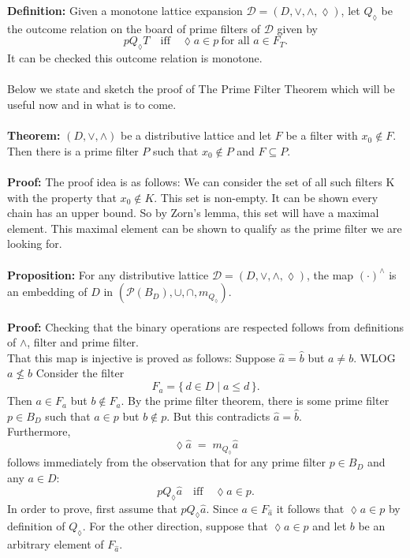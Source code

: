 \documentclass[12pt]{article}
\begin{document}
\textbf{Definition:}  
Given a monotone lattice expansion $\mathcal{D} = (D, \vee, \wedge, \lozenge)$,  
let $Q_{\lozenge}$ be the outcome relation on the board of prime filters of $\mathcal{D}$ given by
\[
p Q_{\lozenge} T \quad \text{iff} \quad \lozenge a \in p \ \text{for all } a \in F_{T}.
\]
It can be checked this outcome relation is monotone. \\ \\
Below we state and sketch the proof of The Prime Filter Theorem which will be useful now and in what is to come. \\ \\
\textbf{Theorem:} $(D,\vee,\wedge)$ be a distributive lattice and let $F$ be a filter with $x_0 \notin F$. 
Then there is a prime filter $P$ such that $x_0\notin P$ and $F\subseteq P$.\\ \\
\textbf{Proof:} The proof idea is as follows: We can consider the set of all such filters K with the property that $x_0 \notin K $. This set is non-empty. It can be shown every chain has an upper bound. So by Zorn's lemma, this set will have a maximal element. This maximal element can be shown to qualify as the prime filter we are looking for. \\ \\
\textbf{Proposition:} For any distributive lattice $\mathcal{D}=(D, \vee, \wedge, \lozenge)$, the map $(\cdot)^{\wedge}$ is an embedding of $D$ in 
$(\mathcal{P}(B_D), \cup, \cap,m_{Q_{\lozenge}})$. \\ \\
\textbf{Proof:} Checking that the binary operations are respected follows from definitions of $\wedge$, filter and prime filter. \\
That this map is injective is proved as follows:  
Suppose $\widehat{a} = \widehat{b}$ but $a \neq b$. WLOG $a \nleq b$
Consider the filter 
\[
F_{a} = \{\, d \in D \mid a \leq d \,\}.
\]
Then $a \in F_{a}$ but $b \notin F_{a}$.  
By the prime filter theorem, there is some prime filter $p \in B_{D}$ such that  
$a \in p$ but $b \notin p$.  
But this contradicts $\widehat{a} = \widehat{b}$. \\
Furthermore, 
\[
\lozenge \widehat{a} \;=\; m_{Q_{\lozenge}} \widehat{a}
\]
follows immediately from the observation that for any prime filter $p \in B_{D}$ and any $a \in D$:  
\[
p Q_{\lozenge} \widehat{a} \quad \text{iff} \quad \lozenge a \in p.
\]
In order to prove, first assume that $p Q_{\lozenge} \widehat{a}$.  
Since $a \in F_{\widehat{a}}$ it follows that $\lozenge a \in p$ by definition of $Q_{\lozenge}$. For the other direction, suppose that $\lozenge a \in p$ and let $b$ be an arbitrary element of $F_{\widehat{a}}$.  
\end{document}
